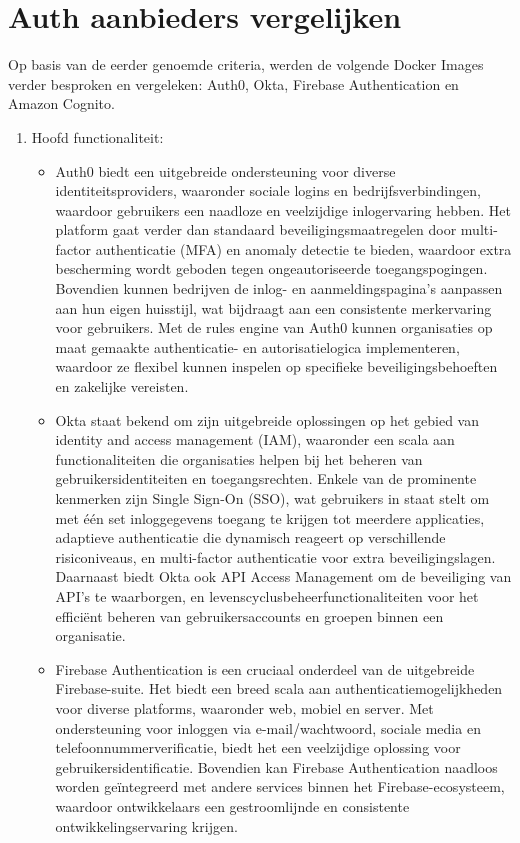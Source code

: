 \section{Auth aanbieders vergelijken}%
\label{sec:auth-aanbieders-vergelijken}
Op basis van de eerder genoemde criteria, werden de volgende Docker Images verder besproken en vergeleken: Auth0, Okta, Firebase Authentication en Amazon Cognito.
\begin{enumerate}
  \item Hoofd functionaliteit:
  \begin{itemize}
    \item Auth0 biedt een uitgebreide ondersteuning voor diverse identiteitsproviders, waaronder sociale logins en bedrijfsverbindingen, waardoor gebruikers een naadloze en veelzijdige inlogervaring hebben. Het platform gaat verder dan standaard beveiligingsmaatregelen door multi-factor authenticatie (MFA) en anomaly detectie te bieden, waardoor extra bescherming wordt geboden tegen ongeautoriseerde toegangspogingen. Bovendien kunnen bedrijven de inlog- en aanmeldingspagina's aanpassen aan hun eigen huisstijl, wat bijdraagt aan een consistente merkervaring voor gebruikers. Met de rules engine van Auth0 kunnen organisaties op maat gemaakte authenticatie- en autorisatielogica implementeren, waardoor ze flexibel kunnen inspelen op specifieke beveiligingsbehoeften en zakelijke vereisten.
    \item Okta staat bekend om zijn uitgebreide oplossingen op het gebied van identity and access management (IAM), waaronder een scala aan functionaliteiten die organisaties helpen bij het beheren van gebruikersidentiteiten en toegangsrechten. Enkele van de prominente kenmerken zijn Single Sign-On (SSO), wat gebruikers in staat stelt om met één set inloggegevens toegang te krijgen tot meerdere applicaties, adaptieve authenticatie die dynamisch reageert op verschillende risiconiveaus, en multi-factor authenticatie voor extra beveiligingslagen. Daarnaast biedt Okta ook API Access Management om de beveiliging van API's te waarborgen, en levenscyclusbeheerfunctionaliteiten voor het efficiënt beheren van gebruikersaccounts en groepen binnen een organisatie.
    \item Firebase Authentication is een cruciaal onderdeel van de uitgebreide Firebase-suite. Het biedt een breed scala aan authenticatiemogelijkheden voor diverse platforms, waaronder web, mobiel en server. Met ondersteuning voor inloggen via e-mail/wachtwoord, sociale media en telefoonnummerverificatie, biedt het een veelzijdige oplossing voor gebruikersidentificatie. Bovendien kan Firebase Authentication naadloos worden geïntegreerd met andere services binnen het Firebase-ecosysteem, waardoor ontwikkelaars een gestroomlijnde en consistente ontwikkelingservaring krijgen.

\end{itemize}
\end{enumerate}
